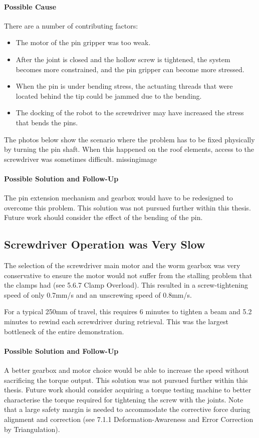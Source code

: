 \paragraph{Possible Cause}
There are a number of contributing factors:
\begin{itemize}
    \item The motor of the pin gripper was too weak.
    \item After the joint is closed and the hollow screw is tightened, the system becomes more constrained, and the pin gripper can become more stressed.
    \item When the pin is under bending stress, the actuating threads that were located behind the tip could be jammed due to the bending.
    \item The docking of the robot to the screwdriver may have increased the stress that bends the pins.
\end{itemize}
The photos below show the scenario where the problem has to be fixed physically by turning the pin shaft. When this happened on the roof elements, access to the screwdriver was sometimes difficult.
missingimage

\paragraph{Possible Solution and Follow-Up}
The pin extension mechanism and gearbox would have to be redesigned to overcome this problem. This solution was not pursued further within this thesis. Future work should consider the effect of the bending of the pin.

\subsection{Screwdriver Operation was Very Slow}
\label{subsection:exploration_4_screwdriver_operation_was_very_slow}

The selection of the screwdriver main motor and the worm gearbox was very conservative to ensure the motor would not suffer from the stalling problem that the clamps had (see 5.6.7 Clamp Overload). This resulted in a screw-tightening speed of only 0.7mm/s and an unscrewing speed of 0.8mm/s. 

For a typical 250mm of travel, this requires 6 minutes to tighten a beam and 5.2 minutes to rewind each screwdriver during retrieval. This was the largest bottleneck of the entire demonstration.

\paragraph{Possible Solution and Follow-Up}
A better gearbox and motor choice would be able to increase the speed without sacrificing the torque output. This solution was not pursued further within this thesis. Future work should consider acquiring a torque testing machine to better characterise the torque required for tightening the screw with the joints. Note that a large safety margin is needed to accommodate the corrective force during alignment and correction (see 7.1.1 Deformation-Awareness and Error Correction by Triangulation). 

